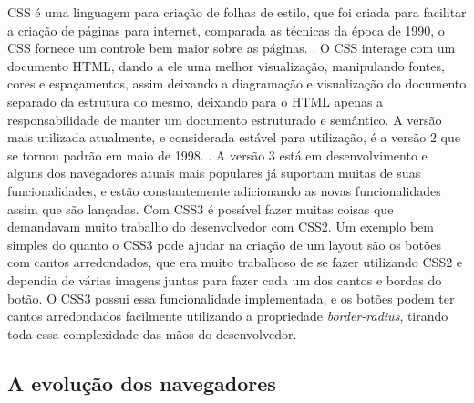 CSS é uma linguagem para criação de folhas de estilo, que foi criada
para facilitar a criação de páginas para internet, comparada as técnicas da época de
1990, o CSS fornece um controle bem maior sobre as páginas. \cite{schmitt2009css}.
O CSS interage com um documento HTML, dando a ele uma melhor visualização, manipulando
fontes, cores e espaçamentos, assim deixando a diagramação e visualização do documento
separado da estrutura do mesmo, deixando para o HTML apenas a
responsabilidade de manter um documento estruturado e semântico.
A versão mais utilizada atualmente, e considerada estável para utilização, é a versão 2
que se tornou padrão em maio de 1998. \cite{zeldman2009designing}.
A versão 3 está em desenvolvimento e alguns dos navegadores atuais mais populares
já suportam muitas de suas funcionalidades, e estão constantemente
adicionando as novas funcionalidades assim que são lançadas.
Com CSS3 é possível fazer muitas coisas que demandavam muito trabalho
do desenvolvedor com CSS2. Um exemplo bem simples do quanto o CSS3
pode ajudar na criação de um layout são os botões com cantos
arredondados, que era muito trabalhoso de se fazer utilizando CSS2 e
dependia de várias imagens juntas para fazer cada um dos cantos e
bordas do botão. O CSS3 possui essa funcionalidade implementada, e os
botões podem ter cantos arredondados facilmente utilizando a
propriedade \textit{border-radius}, tirando toda essa complexidade das mãos do
desenvolvedor.

\subsection{A evolução dos navegadores}


